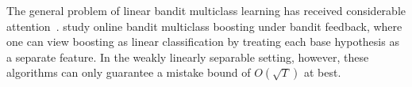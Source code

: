 

The general problem of linear bandit multiclass learning has received considerable attention~\citep{Abernethy-Rakhlin-2009, Wang-Jin-Valizadegan-2010,
Crammer-Gentile-2013, Hazan-Kale-2011, Beygelzimer-Orabona-Zhang-2017,
Foster-Kale-Luo-Mohri-Sridharan-2018}. \citet{Chen-Lin-Lu-2014,
Zhang-Jung-Tewari-2018} study online bandit multiclass boosting under bandit
feedback, where one can view boosting as linear classification by treating each
base hypothesis as a separate feature.
In the weakly linearly separable setting, however,
these algorithms can only guarantee a mistake
bound of ${O}(\sqrt{T})$ at best.


